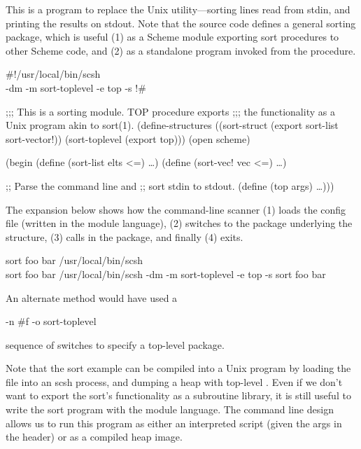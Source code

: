 \begin{itemize}
This is a program to replace the Unix  utility---sorting lines
read from stdin, and printing the results on stdout.
Note that the source code defines a general sorting package, 
which is useful (1) as a Scheme module exporting sort procedures
to other Scheme code, and (2) as a standalone program invoked from
the  procedure.
\begin{code}
#!/usr/local/bin/scsh \\
-dm -m sort-toplevel -e top -s
!#

;;; This is a sorting module. TOP procedure exports
;;; the functionality as a Unix program akin to sort(1).
(define-structures ((sort-struct (export sort-list
                                         sort-vector!))
                    (sort-toplevel (export top)))
  (open scheme)

  (begin (define (sort-list elts <=) {\ldots})
         (define (sort-vec! vec <=)  {\ldots})

         ;; Parse the command line and 
         ;; sort stdin to stdout.
         (define (top args)
            {\ldots})))\end{code}

The expansion below shows how the command-line scanner
(1) loads the config file  (written in the {\scm} module language),
(2) switches to the package underlying the  structure,
(3) calls  in the package, and finally
(4) exits.
%
{\small
\begin{centercode}
sort foo bar
{\evalto} /usr/local/bin/scsh \\ sort                              foo bar
{\evalto} /usr/local/bin/scsh -dm -m sort-toplevel -e top -s sort foo bar\end{centercode}}

An alternate method would have used a 
\begin{code}
-n #f -o sort-toplevel\end{code}
sequence of switches to specify a top-level package.

\end{itemize}

Note that the sort example can be compiled into a Unix program by
loading the file into an scsh process, and dumping a heap with top-level
.  Even if we don't want to export the sort's functionality as a
subroutine library, it is still useful to write the sort program with the
module language. The command line design allows us to run this program as
either an interpreted script (given the \ex{\#!} args in the header) or as a
compiled heap image.

